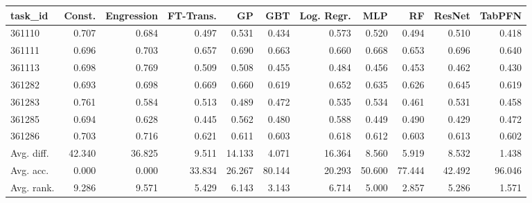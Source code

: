 \begin{tabular}{lrrrrrrrrrr}
\toprule
task\_id & Const. & Engression & FT-Trans. & GP & GBT & Log. Regr. & MLP & RF & ResNet & TabPFN \\
\midrule
361110 & 0.707 & 0.684 & 0.497 & 0.531 & 0.434 & 0.573 & 0.520 & 0.494 & 0.510 & 0.418 \\
361111 & 0.696 & 0.703 & 0.657 & 0.690 & 0.663 & 0.660 & 0.668 & 0.653 & 0.696 & 0.640 \\
361113 & 0.698 & 0.769 & 0.509 & 0.508 & 0.455 & 0.484 & 0.456 & 0.453 & 0.462 & 0.430 \\
361282 & 0.693 & 0.698 & 0.669 & 0.660 & 0.619 & 0.652 & 0.635 & 0.626 & 0.645 & 0.619 \\
361283 & 0.761 & 0.584 & 0.513 & 0.489 & 0.472 & 0.535 & 0.534 & 0.461 & 0.531 & 0.458 \\
361285 & 0.694 & 0.628 & 0.445 & 0.562 & 0.480 & 0.588 & 0.449 & 0.490 & 0.429 & 0.472 \\
361286 & 0.703 & 0.716 & 0.621 & 0.611 & 0.603 & 0.618 & 0.612 & 0.603 & 0.613 & 0.602 \\
Avg. diff. & 42.340 & 36.825 & 9.511 & 14.133 & 4.071 & 16.364 & 8.560 & 5.919 & 8.532 & 1.438 \\
Avg. acc. & 0.000 & 0.000 & 33.834 & 26.267 & 80.144 & 20.293 & 50.600 & 77.444 & 42.492 & 96.046 \\
Avg. rank. & 9.286 & 9.571 & 5.429 & 6.143 & 3.143 & 6.714 & 5.000 & 2.857 & 5.286 & 1.571 \\
\bottomrule
\end{tabular}
